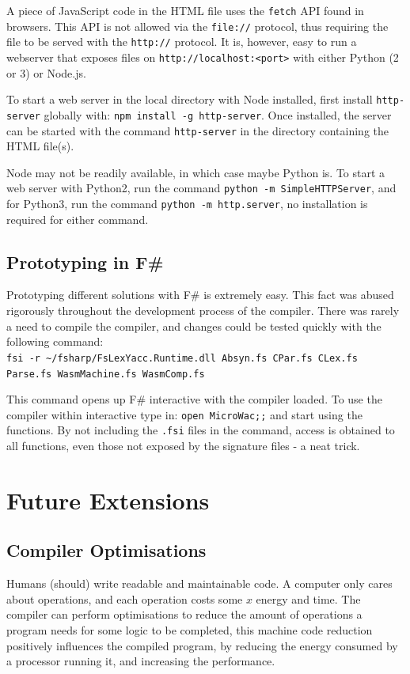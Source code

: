 \documentclass[a4paper]{article}
\begin{document}
A piece of JavaScript code in the HTML file uses the \texttt{fetch} API found in browsers. This API is not allowed via the \texttt{file://} protocol, thus requiring the file to be served with the \texttt{http://} protocol. It is, however, easy to run a webserver that exposes files on \texttt{http://localhost:<port>} with either Python (2 or 3) or Node.js.

To start a web server in the local directory with Node installed, first install \texttt{http-server} globally with: \verb$npm install -g http-server$. Once installed, the server can be started with the command \texttt{http-server} in the directory containing the HTML file(s).

Node may not be readily available, in which case maybe Python is. To start a web server with Python2, run the command \texttt{python -m SimpleHTTPServer}, and for Python3, run the command \texttt{python -m http.server}, no installation is required for either command.


\subsection{Prototyping in F\#}
\label{sec:peripherals:prototyping}
Prototyping different solutions with F\# is extremely easy. This fact was abused rigorously throughout the development process of the compiler. There was rarely a need to compile the compiler, and changes could be tested quickly with the following command:\\
\texttt{fsi -r \textasciitilde/fsharp/FsLexYacc.Runtime.dll Absyn.fs CPar.fs CLex.fs Parse.fs WasmMachine.fs WasmComp.fs}

This command opens up F\# interactive with the compiler loaded. To use the compiler within interactive type in: \texttt{open MicroWac;;} and start using the functions. By not including the \texttt{.fsi} files in the command, access is obtained to all functions, even those not exposed by the signature files - a neat trick.

\section{Future Extensions}
\label{sec:extensions}

\subsection{Compiler Optimisations}
\label{sec:extensions:optimisations}
Humans (should) write readable and maintainable code. A computer only cares about operations, and each operation costs some $x$ energy and time. The compiler can perform optimisations to reduce the amount of operations a program needs for some logic to be completed, this machine code reduction positively influences the compiled program, by reducing the energy consumed by a processor running it, and increasing the performance.
\end{document}
